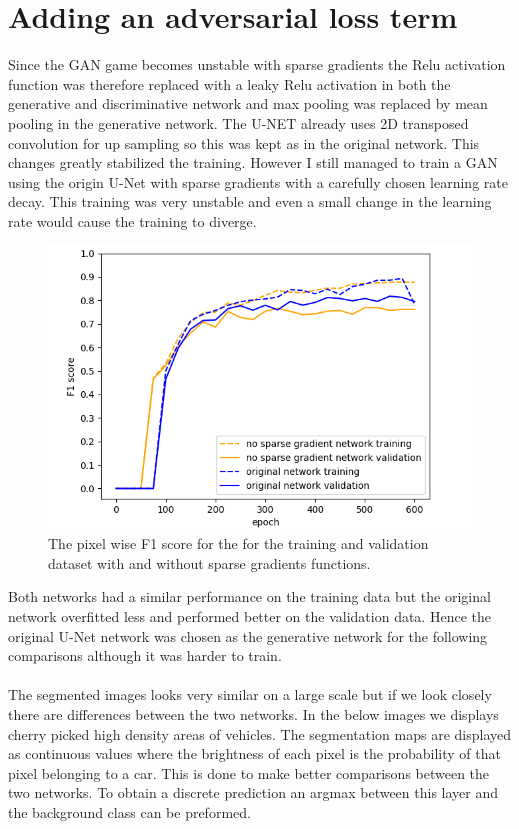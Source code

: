 \documentclass{kththesis}
\begin{document}
\section{Adding an adversarial loss term}
Since the GAN game becomes unstable with sparse gradients the Relu activation function was therefore replaced with a leaky Relu activation in both the generative and discriminative network and max pooling was replaced by mean pooling in the generative network. The U-NET already uses 2D transposed convolution for up sampling so this was kept as in the original network. This changes greatly stabilized the training. However I still managed to train a GAN using the origin U-Net with sparse gradients with a carefully chosen learning rate decay. This training was very unstable and even a small change in the learning rate would cause the training to diverge.
\begin{center}
\begin{figure}[H]
\centering
      \includegraphics[scale=0.5]{mean_max_2}
  \caption{The pixel wise F1 score for the for the training and validation dataset with and without sparse gradients functions.} \label{fig:sparse}
\end{figure}
\end{center}
Both networks had a similar performance on the training data but the original network overfitted less and performed better on the validation data. Hence the original U-Net network was chosen as the generative network for the following comparisons although it was harder to train.\\
\\
The segmented images looks very similar on a large scale but if we look closely there are differences between the two networks. In the below images we displays cherry picked high density areas of vehicles. The segmentation maps are displayed as continuous values where the brightness of each pixel is the probability of that pixel belonging to a car. This is done to make better comparisons between the two networks. To obtain a discrete prediction an argmax between this layer and the background class can be preformed.
\end{document}
